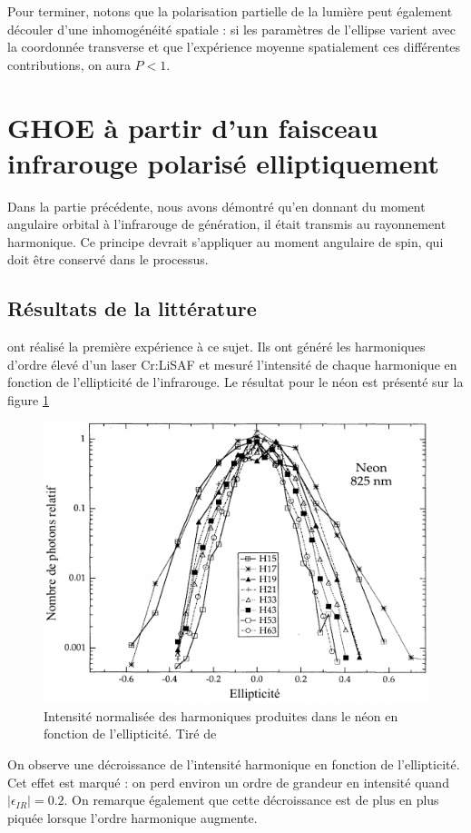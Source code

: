 Pour terminer, notons que la polarisation partielle de la lumière peut également découler d'une inhomogénéité spatiale : si les paramètres de l'ellipse varient avec la coordonnée transverse et que l'expérience moyenne spatialement ces différentes contributions, on aura $P<1$.

\section{GHOE à partir d'un faisceau infrarouge polarisé elliptiquement}
Dans la partie précédente, nous avons démontré qu'en donnant du moment angulaire orbital à l'infrarouge de génération, il était transmis au rayonnement harmonique. Ce principe devrait s'appliquer au moment angulaire de spin, qui doit être conservé dans le processus. 

\subsection{Résultats de la littérature}
 ont réalisé la première expérience à ce sujet. Ils ont généré les harmoniques d'ordre élevé d'un laser Cr:LiSAF et mesuré l'intensité de chaque harmonique en fonction de l'ellipticité de l'infrarouge. Le résultat pour le néon est présenté sur la figure \ref{Fig:budil}
\begin{figure}[!ht]
\centering
\includegraphics[width=0.6\columnwidth]{Figures/Polar/Intensity_f_ellipticity_budil}%
\caption{Intensité normalisée des harmoniques produites dans le néon en fonction de l'ellipticité. Tiré de }%
\label{Fig:budil}%
\end{figure}
On observe une décroissance de l'intensité harmonique en fonction de l'ellipticité. Cet effet est marqué : on perd environ un ordre de grandeur en intensité quand $|\epsilon_{IR}| = 0.2$. On remarque également que cette décroissance est de plus en plus piquée lorsque l'ordre harmonique augmente.


